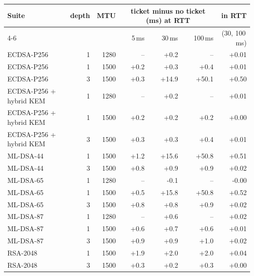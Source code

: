 \begin{tabular}{@{}lrrrrrr@{}}
\toprule
Suite & depth & MTU & \multicolumn{3}{c}{ticket minus no ticket (ms) at RTT} & in RTT \\
\cmidrule(lr){4-6}
 & & & 5\,ms & 30\,ms & 100\,ms & (30, 100\,ms) \\
\midrule
ECDSA-P256 & 1 & 1280 & -- & +0.2 & -- & +0.01 \\
ECDSA-P256 & 1 & 1500 & +0.2 & +0.3 & +0.4 & +0.01 \\
ECDSA-P256 & 3 & 1500 & +0.3 & +14.9 & +50.1 & +0.50 \\
ECDSA-P256 + hybrid KEM & 1 & 1280 & -- & +0.2 & -- & +0.01 \\
ECDSA-P256 + hybrid KEM & 1 & 1500 & +0.2 & +0.2 & +0.2 & +0.00 \\
ECDSA-P256 + hybrid KEM & 3 & 1500 & +0.3 & +0.3 & +0.4 & +0.01 \\
ML-DSA-44 & 1 & 1500 & +1.2 & +15.6 & +50.8 & +0.51 \\
ML-DSA-44 & 3 & 1500 & +0.8 & +0.9 & +0.9 & +0.02 \\
ML-DSA-65 & 1 & 1280 & -- & -0.1 & -- & -0.00 \\
ML-DSA-65 & 1 & 1500 & +0.5 & +15.8 & +50.8 & +0.52 \\
ML-DSA-65 & 3 & 1500 & +0.8 & +0.8 & +0.9 & +0.02 \\
ML-DSA-87 & 1 & 1280 & -- & +0.6 & -- & +0.02 \\
ML-DSA-87 & 1 & 1500 & +0.6 & +0.7 & +0.6 & +0.01 \\
ML-DSA-87 & 3 & 1500 & +0.9 & +0.9 & +1.0 & +0.02 \\
RSA-2048 & 1 & 1500 & +1.9 & +2.0 & +2.0 & +0.04 \\
RSA-2048 & 3 & 1500 & +0.3 & +0.2 & +0.3 & +0.00 \\
\bottomrule
\end{tabular}
